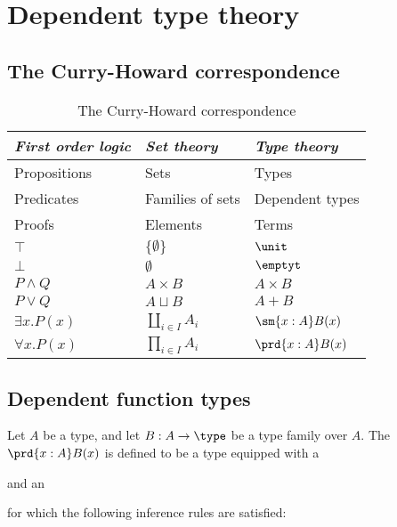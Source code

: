\chapter{Dependent type theory}

\section{The Curry-Howard correspondence}
\begin{table}
\caption{The Curry-Howard correspondence}
\begin{center}
\begin{tabular}{lll}
\toprule
\emph{First order logic} & \emph{Set theory} & \emph{Type theory}\\
\midrule
Propositions & Sets & Types\\
Predicates & Families of sets & Dependent types\\
Proofs & Elements & Terms \\
$\top$ & $\{\emptyset\}$ & $\unit$\\
$\bot$ & $\emptyset$ & $\emptyt$ \\
$P \land Q$ & $A \times B$ & $A \times B$ \\
$P \vee Q$ & $A \sqcup B$ & $A + B$ \\
$\exists x.P(x)$ & $\coprod_{i\in I}A_i$ & $\sm{x:A}B(x)$ \\
$\forall x.P(x)$ & $\prod_{i\in I}A_i$ & $\prd{x:A}B(x)$\\
\bottomrule
\end{tabular}
\end{center}
\end{table}

\section{Dependent function types}
\begin{defn}
Let $A$ be a type, and let $B:A\to\type$ be a type family over $A$.
The  $\prd{x:A}B(x)$ is defined to be a type equipped with a 
\begin{prooftree}
\end{prooftree}
and an 
\begin{prooftree}
\end{prooftree}
for which the following inference rules are satisfied:
\begin{prooftree}
\end{prooftree}
\begin{prooftree}
\end{prooftree}
\end{defn}

